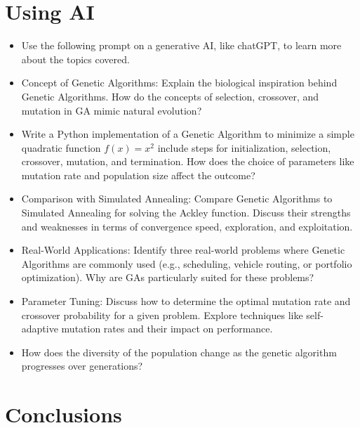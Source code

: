 \documentclass[
  letterpaper,
  DIV=11,
  numbers=noendperiod]{scrreprt}
\providecommand{\tightlist}{%
  \setlength{\itemsep}{0pt}\setlength{\parskip}{0pt}}\usepackage{longtable,booktabs,array}
\begin{document}

\chapter{Using AI}\label{using-ai-7}

\begin{itemize}
\tightlist
\item
  Use the following prompt on a generative AI, like chatGPT, to learn
  more about the topics covered.
\item
  Concept of Genetic Algorithms: Explain the biological inspiration
  behind Genetic Algorithms. How do the concepts of selection,
  crossover, and mutation in GA mimic natural evolution?
\item
  Write a Python implementation of a Genetic Algorithm to minimize a
  simple quadratic function \(f(x) = x^2\) include steps for
  initialization, selection, crossover, mutation, and termination. How
  does the choice of parameters like mutation rate and population size
  affect the outcome?
\item
  Comparison with Simulated Annealing: Compare Genetic Algorithms to
  Simulated Annealing for solving the Ackley function. Discuss their
  strengths and weaknesses in terms of convergence speed, exploration,
  and exploitation.
\item
  Real-World Applications: Identify three real-world problems where
  Genetic Algorithms are commonly used (e.g., scheduling, vehicle
  routing, or portfolio optimization). Why are GAs particularly suited
  for these problems?
\item
  Parameter Tuning: Discuss how to determine the optimal mutation rate
  and crossover probability for a given problem. Explore techniques like
  self-adaptive mutation rates and their impact on performance.
\item
  How does the diversity of the population change as the genetic
  algorithm progresses over generations?
\end{itemize}


\chapter{Conclusions}\label{conclusions-5}
\end{document}
